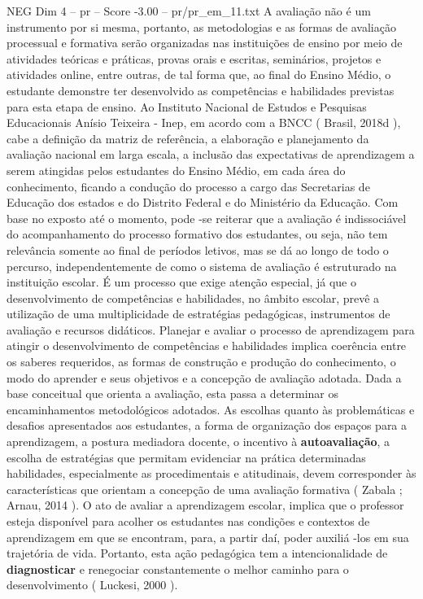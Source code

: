\begin{textsample}{NEG Dim 4 – pr – Score -3.00 – pr/pr\_em\_11.txt}
A avaliação não é um instrumento por si mesma, portanto, as metodologias e as formas de avaliação processual e formativa serão organizadas nas instituições de ensino por meio de atividades teóricas e práticas, provas orais e escritas, seminários, projetos e atividades online, entre outras, de tal forma que, ao final do Ensino Médio, o estudante demonstre ter desenvolvido as competências e habilidades previstas para esta etapa de ensino.
Ao Instituto Nacional de Estudos e Pesquisas Educacionais Anísio Teixeira - Inep, em acordo com a BNCC ( Brasil, 2018d ), cabe a definição da matriz de referência, a elaboração e planejamento da avaliação nacional em larga escala, a inclusão das expectativas de aprendizagem a serem atingidas pelos estudantes do Ensino Médio, em cada área do conhecimento, ficando a condução do processo a cargo das Secretarias de Educação dos estados e do Distrito Federal e do Ministério da Educação.
Com base no exposto até o momento, pode -se reiterar que a avaliação é indissociável do acompanhamento do processo formativo dos estudantes, ou seja, não tem relevância somente ao final de períodos letivos, mas se dá ao longo de todo o percurso, independentemente de como o sistema de avaliação é estruturado na instituição escolar.
É um processo que exige atenção especial, já que o desenvolvimento de competências e habilidades, no âmbito escolar, prevê a utilização de uma multiplicidade de estratégias pedagógicas, instrumentos de avaliação e recursos didáticos.
Planejar e avaliar o processo de aprendizagem para atingir o desenvolvimento de competências e habilidades implica coerência entre os saberes requeridos, as formas de construção e produção do conhecimento, o modo do aprender e seus objetivos e a concepção de avaliação adotada.
Dada a base conceitual que orienta a avaliação, esta passa a determinar os encaminhamentos metodológicos adotados.
As escolhas quanto às problemáticas e desafios apresentados aos estudantes, a forma de organização dos espaços para a aprendizagem, a postura mediadora docente, o incentivo à \textbf{autoavaliação}, a escolha de estratégias que permitam evidenciar na prática determinadas habilidades, especialmente as procedimentais e atitudinais, devem corresponder às características que orientam a concepção de uma avaliação formativa ( Zabala ; Arnau, 2014 ).
O ato de avaliar a aprendizagem escolar, implica que o professor esteja disponível para acolher os estudantes nas condições e contextos de aprendizagem em que se encontram, para, a partir daí, poder auxiliá -los em sua trajetória de vida.
Portanto, esta ação pedagógica tem a intencionalidade de \textbf{diagnosticar} e renegociar constantemente o melhor caminho para o desenvolvimento ( Luckesi, 2000 ).

\end{textsample}

